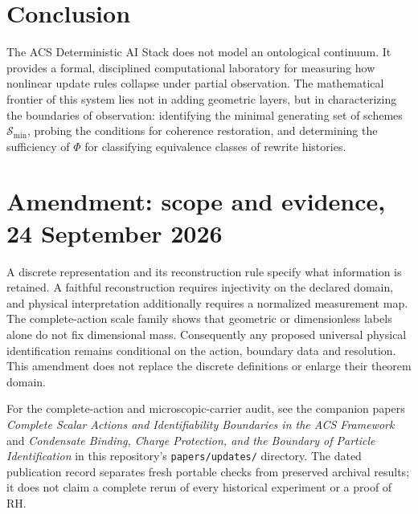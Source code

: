 \documentclass[11pt,a4paper]{article}
\begin{document}
\section{Conclusion}

The ACS Deterministic AI Stack does not model an ontological continuum. It provides a formal, disciplined computational laboratory for measuring how nonlinear update rules collapse under partial observation. The mathematical frontier of this system lies not in adding geometric layers, but in characterizing the boundaries of observation: identifying the minimal generating set of schemes $\mathcal{S}_{\text{min}}$, probing the conditions for coherence restoration, and determining the sufficiency of $\Phi$ for classifying equivalence classes of rewrite histories.


\section*{Amendment: scope and evidence, 24 September 2026}
A discrete representation and its reconstruction rule specify what information is retained. A faithful reconstruction requires injectivity on the declared domain, and physical interpretation additionally requires a normalized measurement map. The complete-action scale family shows that geometric or dimensionless labels alone do not fix dimensional mass. Consequently any proposed universal physical identification remains conditional on the action, boundary data and resolution. This amendment does not replace the discrete definitions or enlarge their theorem domain.

For the complete-action and microscopic-carrier audit, see the companion
papers \emph{Complete Scalar Actions and Identifiability Boundaries in the ACS
Framework} and \emph{Condensate Binding, Charge Protection, and the Boundary
of Particle Identification} in this repository's \texttt{papers/updates/}
directory. The dated publication record separates fresh portable checks
from preserved archival results; it does not claim a complete rerun of every
historical experiment or a proof of RH.
\end{document}
